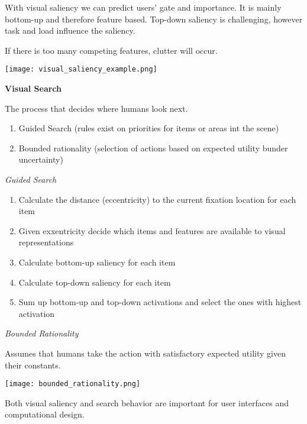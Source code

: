 With visual saliency we can predict users' gate and importance. It is mainly bottom-up and therefore feature based. Top-down saliency is challenging, however task and load influence the saliency. \medskip

If there is too many competing features, clutter will occur. \medskip


\begin{center}
	\texttt{[image: visual\_saliency\_example.png]}
\end{center}



\textbf{Visual Search} \smallskip

The process that decides where humans look next. 

\begin{enumerate}[itemsep=-5pt, topsep=0pt, leftmargin=*]
    \item Guided Search (rules exist on priorities for items or areas int the scene)
    \item Bounded rationality (selection of actions based on expected utility bunder uncertainty)
\end{enumerate}

\medskip

\textit{Guided Search} \smallskip

\begin{enumerate} [itemsep=-5pt, topsep=0pt, leftmargin=*]
    \item Calculate the distance (eccentricity) to the current fixation location for each item
    \item Given exxentricity decide which items and features are available to visual representations
    \item Calculate bottom-up saliency for each item
    \item Calculate top-down saliency for each item
    \item Sum up bottom-up and top-down activations and select the ones with highest activation
\end{enumerate}

\textit{Bounded Rationality} \smallskip

Assumes that humans take the action with satisfactory expected utility given their constants. 

\begin{center}
	\texttt{[image: bounded\_rationality.png]}
\end{center}

Both visual saliency and search behavior are important for user interfaces and computational design. \medskip

